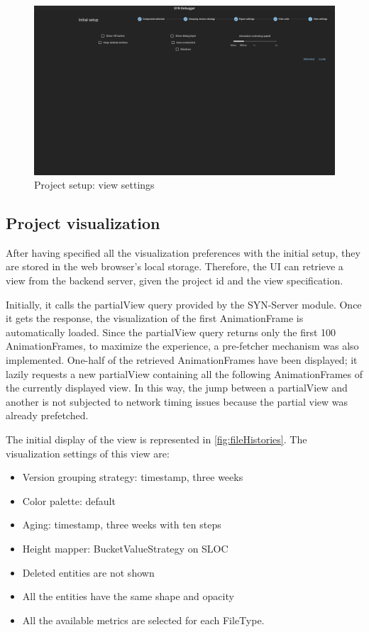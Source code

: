 \begin{figure}
    \center
    \includegraphics[width=\textwidth]{SYNUI-settings5.png}
    \caption{Project setup: view settings}
    \label{fig:SYNUIsettings5}
\end{figure}

\subsection*{Project visualization}
After having specified all the visualization preferences with the initial setup, they are stored in the web browser's local storage. 
Therefore, the UI can retrieve a view from the backend server, given the project id and the view specification. 

Initially, it calls the partialView query provided by the SYN-Server module. Once it gets the response, the visualization of the first AnimationFrame is automatically loaded. 
Since the partialView query returns only the first 100 AnimationFrames, to maximize the experience, a pre-fetcher mechanism was also implemented. 
One-half of the retrieved AnimationFrames have been displayed; it lazily requests a new partialView containing all the following AnimationFrames of the currently displayed view. 
In this way, the jump between a partialView and another is not subjected to network timing issues because the partial view was already prefetched. 
\bigbreak

The initial display of the view is represented in \autoref{fig:fileHistories}. The visualization settings of this view are:
\begin{itemize}
    \item Version grouping strategy: timestamp, three weeks
    \item Color palette: default
    \item Aging: timestamp, three weeks with ten steps
    \item Height mapper: BucketValueStrategy on SLOC
    \item Deleted entities are not shown
    \item All the entities have the same shape and opacity
    \item All the available metrics are selected for each FileType. 
\end{itemize}

